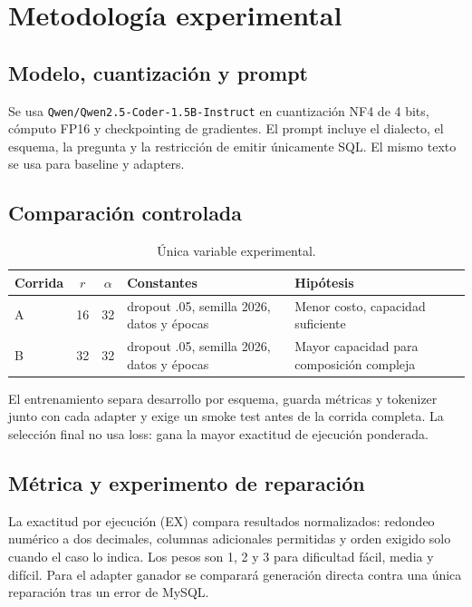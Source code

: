 \documentclass[10pt,letterpaper]{article}
\newcommand{\code}[1]{\texttt{#1}}
\begin{document}
\section{Metodología experimental}
\subsection{Modelo, cuantización y prompt}
Se usa \code{Qwen/Qwen2.5-Coder-1.5B-Instruct} en cuantización NF4 de 4 bits, cómputo FP16 y checkpointing de gradientes. El prompt incluye el dialecto, el esquema, la pregunta y la restricción de emitir únicamente SQL. El mismo texto se usa para baseline y adapters.

\subsection{Comparación controlada}
\begin{table}[H]\centering\caption{Única variable experimental.}
\begin{tabularx}{\textwidth}{@{}lccXX@{}}\toprule Corrida&$r$&$\alpha$&Constantes&Hipótesis\\\midrule A&16&32&dropout .05, semilla 2026, datos y épocas&Menor costo, capacidad suficiente\\B&32&32&dropout .05, semilla 2026, datos y épocas&Mayor capacidad para composición compleja\\\bottomrule\end{tabularx}\end{table}
El entrenamiento separa desarrollo por esquema, guarda métricas y tokenizer junto con cada adapter y exige un smoke test antes de la corrida completa. La selección final no usa loss: gana la mayor exactitud de ejecución ponderada.

\subsection{Métrica y experimento de reparación}
La exactitud por ejecución (EX) compara resultados normalizados: redondeo numérico a dos decimales, columnas adicionales permitidas y orden exigido solo cuando el caso lo indica. Los pesos son 1, 2 y 3 para dificultad fácil, media y difícil. Para el adapter ganador se comparará generación directa contra una única reparación tras un error de MySQL.
\end{document}

